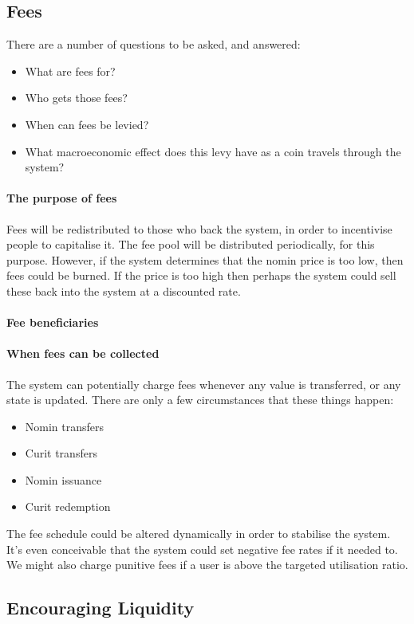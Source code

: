 \documentclass{article}
\begin{document}
\subsection{Fees}
There are a number of questions to be asked, and answered:
\begin{itemize}
    \item What are fees for?
    \item Who gets those fees?
    \item When can fees be levied?
    \item What macroeconomic effect does this levy have as a coin travels through the system?
\end{itemize}

\paragraph{The purpose of fees}
Fees will be redistributed to those who back the system, in order to incentivise people to capitalise it.
The fee pool will be distributed periodically, for this purpose.
However, if the system determines that the nomin price is too low, then fees could be burned. If the price is
too high then perhaps the system could sell these back into the system at a discounted rate.

\paragraph{Fee beneficiaries}

\paragraph{When fees can be collected}
The system can potentially charge fees whenever any value is transferred, or any state is updated.
There are only a few circumstances that these things happen:
\begin{itemize}
    \item Nomin transfers
    \item Curit transfers
    \item Nomin issuance
    \item Curit redemption
\end{itemize}
The fee schedule could be altered dynamically in order to stabilise the system. It's even conceivable
that the system could set negative fee rates if it needed to.
We might also charge punitive fees if a user is above the targeted utilisation ratio.

\subsection{Encouraging Liquidity}
\end{document}
